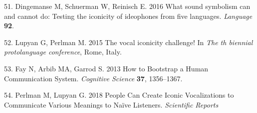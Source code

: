\documentclass[english,floatsintext,man]{apa6}
\theoremstyle{definition}
\theoremstyle{definition}
\theoremstyle{definition}
\theoremstyle{remark}
\begin{document}
\leavevmode\hypertarget{ref-Dingemanse:2016vd}{}%
51. Dingemanse M, Schuerman W, Reinisch E. 2016 What sound symbolism can
and cannot do: Testing the iconicity of ideophones from five languages.
\emph{Language} \textbf{92}.

\leavevmode\hypertarget{ref-Lupyan:2015vic}{}%
52. Lupyan G, Perlman M. 2015 The vocal iconicity challenge! In
\emph{The th biennial protolanguage conference}, Rome, Italy.

\leavevmode\hypertarget{ref-Fay:2013jpa}{}%
53. Fay N, Arbib MA, Garrod S. 2013 How to Bootstrap a Human
Communication System. \emph{Cognitive Science} \textbf{37}, 1356--1367.

\leavevmode\hypertarget{ref-Perlman:2018cs}{}%
54. Perlman M, Lupyan G. 2018 People Can Create Iconic Vocalizations to
Communicate Various Meanings to Naïve Listeners. \emph{Scientific
Reports}


\clearpage
\renewcommand{\listtablename}{Table captions}
\listoftables

\clearpage
\renewcommand{\listfigurename}{Figure captions}
\listoffigures
\end{document}
